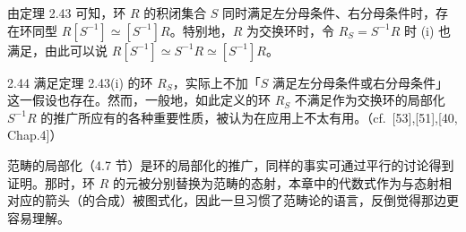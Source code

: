 
由定理 2.43 可知，环 $R$ 的积闭集合 $S$ 同时满足左分母条件、右分母条件时，存在环同型 $R[S^{-1}]\simeq[S^{-1}]R$。特别地，$R$ 为交换环时，令 $R_S=S^{-1}R$ 时 (i) 也满足，由此可以说 $R[S^{-1}]\simeq S^{-1}R\simeq[S^{-1}]R$。


\begin{remark}{2.44} 满足定理 2.43(i) 的环 $R_S$，实际上不加「$S$ 满足左分母条件或右分母条件」这一假设也存在。然而，一般地，如此定义的环 $R_S$ 不满足作为交换环的局部化 $S^{-1}R$ 的推广所应有的各种重要性质，被认为在应用上不太有用。（cf.\ [53],[51],[40, Chap.4]）\end{remark}


范畴的局部化（4.7 节）是环的局部化的推广，同样的事实可通过平行的讨论得到证明。那时，环 $R$ 的元被分别替换为范畴的态射，本章中的代数式作为与态射相对应的箭头（的合成）被图式化，因此一旦习惯了范畴论的语言，反倒觉得那边更容易理解。


